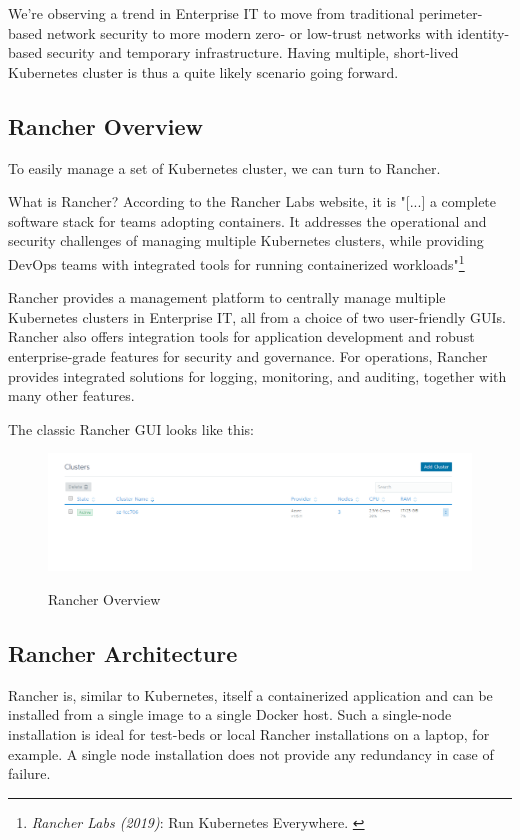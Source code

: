 We're observing a trend in Enterprise IT to move from traditional perimeter-based network security to more modern zero- or low-trust networks with identity-based security and temporary infrastructure. Having multiple, short-lived Kubernetes cluster is thus a quite likely scenario going forward.

\subsection{Rancher Overview}

To easily manage a set of Kubernetes cluster, we can turn to Rancher.

What is Rancher? According to the Rancher Labs website, it is "[...] a complete software stack for teams adopting containers. It addresses the operational and security challenges of managing multiple Kubernetes clusters, while providing DevOps teams with integrated tools for running containerized workloads"\footnote{\textit{Rancher Labs (2019)}: Run Kubernetes Everywhere. \cite{rancher}}

Rancher provides a management platform to centrally manage multiple Kubernetes clusters in Enterprise IT, all from a choice of two user-friendly GUIs. Rancher also offers integration tools for application development and robust enterprise-grade features for security and governance. For operations, Rancher provides integrated solutions for logging, monitoring, and auditing, together with many other features.

The classic Rancher GUI looks like this:

\begin{figure}[H]
\centering
\caption {Rancher Overview}
\includegraphics[width=\linewidth]{images/cluster-overview.png}
\label{fig:rancherOverview}
\end{figure}

\subsection{Rancher Architecture}

Rancher is, similar to Kubernetes, itself a containerized application and can be installed from a single image to a single Docker host. Such a single-node installation is ideal for test-beds or local Rancher installations on a laptop, for example. A single node installation does not provide any redundancy in case of failure.

